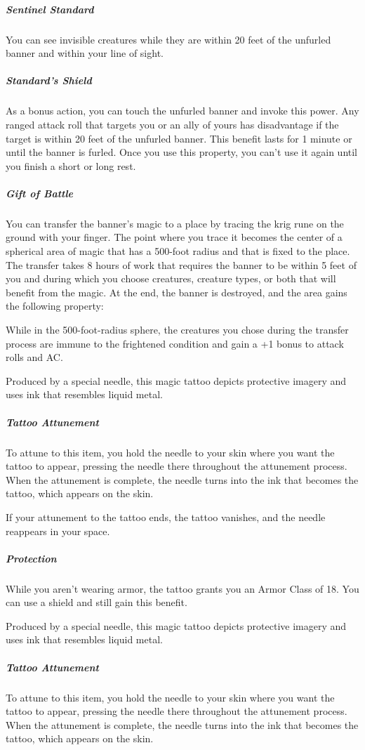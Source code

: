\documentclass[10pt,a4paper,twoside,bg=print,twocolumn,openany,nodeprecatedcode]{dndbook}
\begin{document}
\subparagraph{Sentinel Standard}
You can see invisible creatures while they are within 20 feet of the unfurled banner and within your line of sight.

\subparagraph{Standard's Shield}
As a bonus action, you can touch the unfurled banner and invoke this power. Any ranged attack roll that targets you or an ally of yours has disadvantage if the target is within 20 feet of the unfurled banner. This benefit lasts for 1 minute or until the banner is furled. Once you use this property, you can't use it again until you finish a short or long rest.

\subparagraph{Gift of Battle}
You can transfer the banner's magic to a place by tracing the krig rune on the ground with your finger. The point where you trace it becomes the center of a spherical area of magic that has a 500-foot radius and that is fixed to the place. The transfer takes 8 hours of work that requires the banner to be within 5 feet of you and during which you choose creatures, creature types, or both that will benefit from the magic. At the end, the banner is destroyed, and the area gains the following property:

While in the 500-foot-radius sphere, the creatures you chose during the transfer process are immune to the frightened condition and gain a +1 bonus to attack rolls and AC.

Produced by a special needle, this magic tattoo depicts protective imagery and uses ink that resembles liquid metal.

\subparagraph{Tattoo Attunement}
To attune to this item, you hold the needle to your skin where you want the tattoo to appear, pressing the needle there throughout the attunement process. When the attunement is complete, the needle turns into the ink that becomes the tattoo, which appears on the skin.

If your attunement to the tattoo ends, the tattoo vanishes, and the needle reappears in your space.

\subparagraph{Protection}
While you aren't wearing armor, the tattoo grants you an Armor Class of 18. You can use a shield and still gain this benefit.

Produced by a special needle, this magic tattoo depicts protective imagery and uses ink that resembles liquid metal.

\subparagraph{Tattoo Attunement}
To attune to this item, you hold the needle to your skin where you want the tattoo to appear, pressing the needle there throughout the attunement process. When the attunement is complete, the needle turns into the ink that becomes the tattoo, which appears on the skin.
\end{document}
